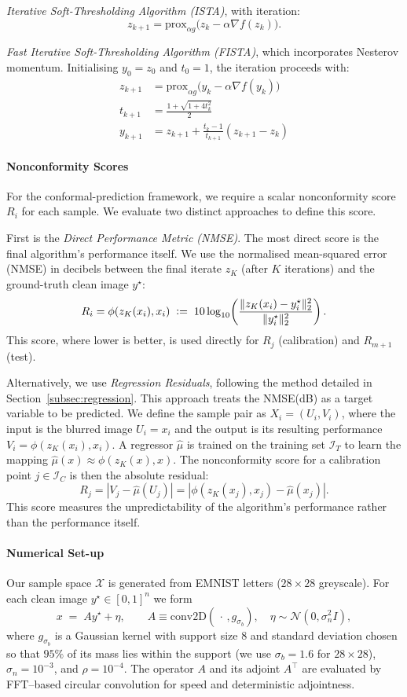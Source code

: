\emph{Iterative Soft-Thresholding Algorithm (ISTA)}, with iteration:
\[
z_{k+1} = \mathrm{prox}_{\alpha g}\big(z_k - \alpha \nabla f(z_k)\big).
\]
    
\emph{Fast Iterative Soft-Thresholding Algorithm (FISTA)}, which incorporates Nesterov momentum. Initialising $y_0 = z_0$ and $t_0 = 1$, the iteration proceeds with:
\begin{align*}
z_{k+1} &= \mathrm{prox}_{\alpha g}\big(y_k - \alpha \nabla f(y_k)\big) \\
t_{k+1} &= \frac{1 + \sqrt{1 + 4 t_k^2}}{2} \\
y_{k+1} &= z_{k+1} + \frac{t_k - 1}{t_{k+1}} (z_{k+1} - z_k)
\end{align*}

\paragraph{Nonconformity Scores}
For the conformal-prediction framework, we require a scalar nonconformity score $R_i$ for each sample. We evaluate two distinct approaches to define this score.

First is the \emph{Direct Performance Metric (NMSE)}. The most direct score is the final algorithm's performance itself. We use the normalised mean-squared error (NMSE) in decibels between the final iterate $z_K$ (after $K$ iterations) and the ground-truth clean image $y^\star$:
\[
R_i = \phi(z_K(x_i), x_i) \;\vcentcolon=\; 10\log_{10}\!\left(\frac{\|z_K(x_i)-y^\star_i\|_2^2}{\|y^\star_i\|_2^2}\right).
\]
This score, where lower is better, is used directly for $R_j$ (calibration) and $R_{m+1}$ (test).

Alternatively, we use \emph{Regression Residuals}, following the method detailed in Section~\ref{subsec:regression}. This approach treats the NMSE(dB) as a target variable to be predicted. We define the sample pair as $X_i = (U_i, V_i)$, where the input is the blurred image $U_i = x_i$ and the output is its resulting performance $V_i = \phi(z_K(x_i), x_i)$. A regressor $\hat{\mu}$ is trained on the training set $\mathcal{I}_T$ to learn the mapping $\hat{\mu}(x) \approx \phi(z_K(x), x)$. The nonconformity score for a calibration point $j \in \mathcal{I}_C$ is then the absolute residual:
\[
R_j = |V_j - \hat{\mu}(U_j)| = |\phi(z_K(x_j), x_j) - \hat{\mu}(x_j)|.
\]
This score measures the unpredictability of the algorithm's performance rather than the performance itself.

\paragraph{Numerical Set-up}
Our sample space $\mathcal{X}$ is generated from EMNIST letters ($28\times 28$ greyscale). For each clean image $y^\star\!\in[0,1]^n$ we form
\[
x \;=\; A y^\star + \eta,\qquad
A \equiv \text{conv2D}(\,\cdot\,, g_{\sigma_b}),\quad
\eta\sim\mathcal{N}(0,\sigma_n^2 I),
\]
where $g_{\sigma_b}$ is a Gaussian kernel with support size $8$ and standard deviation chosen so that $95\%$ of its mass lies within the support (we use $\sigma_b=1.6$ for $28\times 28$), $\sigma_n=10^{-3}$, and $\rho=10^{-4}$. The operator $A$ and its adjoint $A^\top$ are evaluated by FFT–based circular convolution for speed and deterministic adjointness.